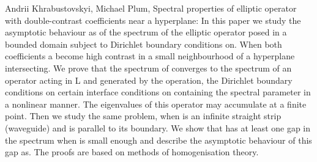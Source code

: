 Andrii Khrabustovskyi, Michael Plum, Spectral properties of elliptic operator with double-contrast coefficients near a hyperplane: In this paper we study the asymptotic behaviour as of the spectrum of the elliptic operator posed in a bounded domain subject to Dirichlet boundary conditions on. When both coefficients a become high contrast in a small neighbourhood of a hyperplane intersecting. We prove that the spectrum of converges to the spectrum of an operator acting in L and generated by the operation, the Dirichlet boundary conditions on certain interface conditions on containing the spectral parameter in a nonlinear manner. The eigenvalues of this operator may accumulate at a finite point. Then we study the same problem, when is an infinite straight strip (waveguide) and is parallel to its boundary. We show that has at least one gap in the spectrum when is small enough and describe the asymptotic behaviour of this gap as. The proofs are based on methods of homogenisation theory.